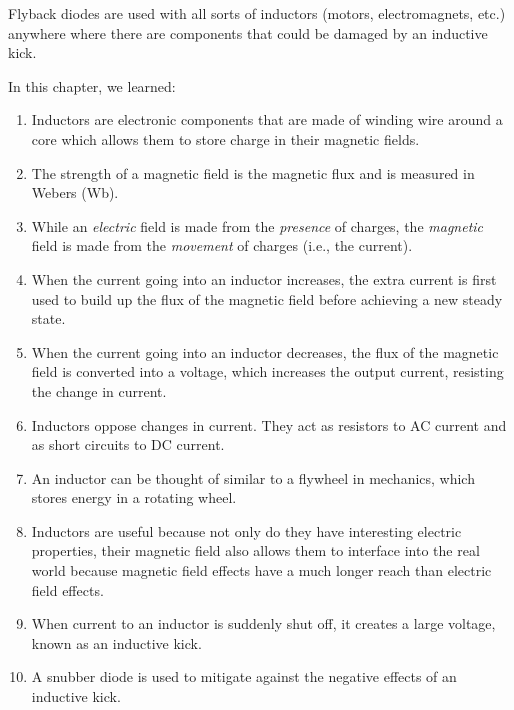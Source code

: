 Flyback diodes are used with all sorts of inductors (motors, electromagnets, etc.) anywhere where there are components that could be damaged by an inductive kick.

\reviewsection

In this chapter, we learned:

\begin{enumerate}
\item Inductors are electronic components that are made of winding wire around a core which allows them to store charge in their magnetic fields.
\item The strength of a magnetic field is the magnetic flux and is measured in Webers (Wb).
\item While an \emph{electric} field is made from the \emph{presence} of charges, the \emph{magnetic} field is made from the \emph{movement} of charges (i.e., the current).
\item When the current going into an inductor increases, the extra current is first used to build up the flux of the magnetic field before achieving a new steady state.
\item When the current going into an inductor decreases, the flux of the magnetic field is converted into a voltage, which increases the output current, resisting the change in current.
\item Inductors oppose changes in current.  They act as resistors to AC current and as short circuits to DC current.
\item An inductor can be thought of similar to a flywheel in mechanics, which stores energy in a rotating wheel.
\item Inductors are useful because not only do they have interesting electric properties, their magnetic field also allows them to interface into the real world because magnetic field effects have a much longer reach than electric field effects.
\item When current to an inductor is suddenly shut off, it creates a large voltage, known as an inductive kick.
\item A snubber diode is used to mitigate against the negative effects of an inductive kick.
\end{enumerate}

\applysection


